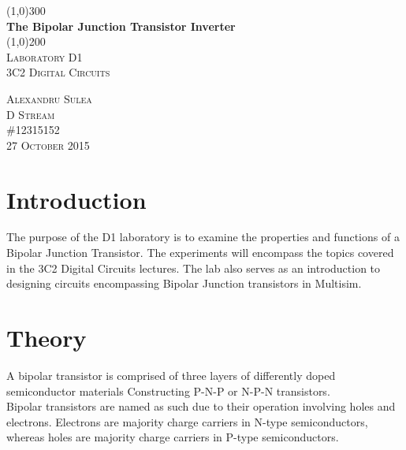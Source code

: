 \documentclass{article}
\begin{document}
\begin{titlepage}
	\begin{center}
	\line(1,0){300}\\
	[0.25in]
	\huge{\bfseries The Bipolar Junction Transistor Inverter}\\
	[2mm]
	\line(1,0){200}\\
	[1.5cm]
	\textsc{\LARGE Laboratory D1 }\\
	[0.75cm]
	\textsc{\Large 3C2 Digital Circuits}\\
	[9cm]	
	\end{center}
	
	\begin{flushright}
	\textsc{\large Alexandru Sulea\\
	D Stream\\
	\#12315152\\
	27 October 2015\\}
	\end{flushright}

\end{titlepage}
\tableofcontents
\listoffigures
{}
\listoftables
{}


\thispagestyle{empty}
\cleardoublepage
{}
\setcounter{page}{1}


\section{Introduction}\label{sec:intro}
The purpose of the D1 laboratory is to examine the properties and functions of a Bipolar Junction Transistor. The experiments will encompass the topics covered in the 3C2 Digital Circuits lectures. The lab also serves as an introduction to designing circuits encompassing Bipolar Junction transistors in Multisim.

\section{Theory}\label{sec:theory}

A bipolar transistor is comprised of three layers of differently doped semiconductor materials
Constructing P-N-P or N-P-N transistors. \\
Bipolar transistors are named as such due to their operation involving holes and electrons. Electrons are majority charge carriers in N-type semiconductors, whereas holes are majority charge carriers in P-type semiconductors. 
\end{document}
